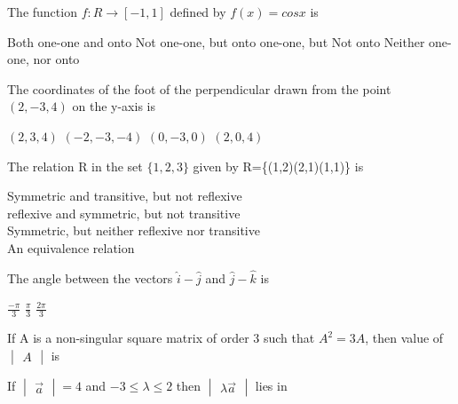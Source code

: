 \documentclass[legalpaper, 12pt, addpoints]{exam}
\begin{document}
\begin{questions}
\question The function  $ f : R \rightarrow \left[-1,1 \right] $ defined by $ f\left(x \right) = cosx $ is

\begin{oneparchoices}
    \CorrectChoice Both one-one and onto
    \choice Not one-one, but onto
    \choice one-one, but Not onto
    \choice Neither one-one, nor onto
\end{oneparchoices}

\question  The coordinates of the foot of the perpendicular drawn from the point $ \left(2,-3,4 \right) $ on the y-axis is 

\begin{oneparchoices}
    \choice $\left(2,3,4\right)$
    \CorrectChoice $\left(-2,-3,-4\right)$
    \choice $\left(0,-3,0\right)$
    \choice $\left(2,0,4\right)$
\end{oneparchoices}


\question  The relation R in the set $ \{1,2,3\}$  given by R=\{(1,2)(2,1)(1,1)\} is

\begin{oneparchoices}
    \choice Symmetric and transitive, but not reflexive  \\
    \choice reflexive and symmetric, but not transitive  \\
    \choice Symmetric, but neither reflexive nor transitive \\
    \CorrectChoice An equivalence relation 
\end{oneparchoices}

\question  The angle between the vectors $ \hat{i} - \hat{j} $ and $ \hat{j} - \hat{k} $ is

\begin{oneparchoices}
    \CorrectChoice $\frac{-\pi}{3}$
    \choice $\frac{\pi}{3}$
    \choice $\frac{2\pi}{3}$
\end{oneparchoices}

\question  If A is a non-singular square matrix of order 3 such that $ A^2 =3A $, then value of  $\begin{vmatrix}A \end{vmatrix}$ is

\begin{oneparchoices}
\end{oneparchoices}


\question  If $\begin{vmatrix}\overrightarrow{a} \end{vmatrix} = 4 $ and  $ -3\leq \lambda \leq 2 $ then $\begin{vmatrix}\lambda \overrightarrow{a} \end{vmatrix} $ lies in


\end{questions}
\end{document}
